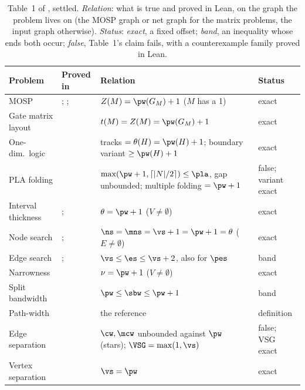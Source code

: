 \begin{table}[t]
\centering\small
\caption{Table~1 of \citet{LY2002}, settled. \emph{Relation}: what is true and
proved in Lean, on the graph the problem lives on (the MOSP graph or net graph
for the matrix problems, the input graph otherwise). \emph{Status}:
\emph{exact}, a fixed offset; \emph{band}, an inequality whose ends both occur;
\emph{false}, Table~1's claim fails, with a counterexample family proved in
Lean.}
\label{tab:master}
\begin{tabularx}{\linewidth}{@{}>{\raggedright}p{2.7cm}>{\raggedright}p{3.4cm}>{\raggedright\arraybackslash}X l@{}}
\toprule
Problem & Proved in & Relation & Status \\
\midrule
MOSP & \citet{Yanasse1997a}; \citet{FellowsLangston1989}; \citet{LY2002} &
  $Z(M)=\pw(G_M)+1$ ($M$ has a 1) & exact \\
Gate matrix layout & \citet{LY2002ref6} & $t(M)=Z(M)=\pw(G_M)+1$ & exact \\
One-dim.\ logic & \citet{LY2002ref7} & tracks $=\theta(H)=\pw(H)+1$; boundary variant $\ge\pw(H)+1$ & exact \\
PLA folding & \citet{LY2002ref6} & $\max(\pw+1,\lceil|N|/2\rceil)\le\pla$, gap unbounded; multiple folding $=\pw+1$ & false; variant exact \\
Interval thickness & \citet{LY2002ref6}; \citet{LY2002ref9} & $\theta=\pw+1$ ($V\ne\emptyset$) & exact \\
Node search & \citet{LY2002ref9,LY2002ref10}; \citet{BienstockSeymour1991} & $\ns=\mns=\vs+1=\pw+1=\theta$ ($E\ne\emptyset$) & exact \\
Edge search & \citet{EllisSudboroughTurner1994}; \citet{LY2002ref10} & $\vs\le\es\le\vs+2$, also for $\pes$ & band \\
Narrowness & \citet{LY2002ref11} & $\nu=\pw+1$ ($V\ne\emptyset$) & exact \\
Split bandwidth & \citet{LY2002ref12} & $\pw\le\sbw\le\pw+1$ & band \\
Path-width & \citet{LY2002ref13} & the reference & definition \\
Edge separation & \citet{LY2002ref14} & $\cw,\mcw$ unbounded against $\pw$ (stars); $\VSG=\max(1,\vs)$ & false; VSG exact \\
Vertex separation & \citet{LY2002ref13} & $\vs=\pw$ & exact \\
\bottomrule
\end{tabularx}
\end{table}


